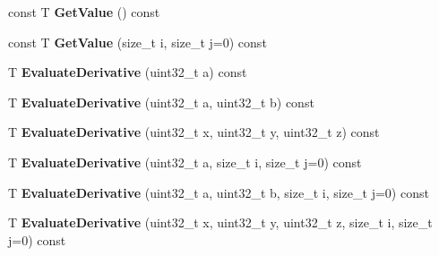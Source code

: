 \begin{DoxyCompactItemize}
\item 
\hypertarget{structatl_1_1_fast_variable_matrix_ac1fac676e85f15f4a449daf2743b4ada}{const T {\bfseries Get\+Value} () const }\label{structatl_1_1_fast_variable_matrix_ac1fac676e85f15f4a449daf2743b4ada}

\item 
\hypertarget{structatl_1_1_fast_variable_matrix_afa69688b8746f6df926e7157bba7d1ee}{const T {\bfseries Get\+Value} (size\+\_\+t i, size\+\_\+t j=0) const }\label{structatl_1_1_fast_variable_matrix_afa69688b8746f6df926e7157bba7d1ee}

\item 
\hypertarget{structatl_1_1_fast_variable_matrix_ab4a1d0ed1ab6ca7bbf3e5fd46d99a037}{T {\bfseries Evaluate\+Derivative} (uint32\+\_\+t a) const }\label{structatl_1_1_fast_variable_matrix_ab4a1d0ed1ab6ca7bbf3e5fd46d99a037}

\item 
\hypertarget{structatl_1_1_fast_variable_matrix_a1d9897ad78586dadfa88cecef82b7d65}{T {\bfseries Evaluate\+Derivative} (uint32\+\_\+t a, uint32\+\_\+t b) const }\label{structatl_1_1_fast_variable_matrix_a1d9897ad78586dadfa88cecef82b7d65}

\item 
\hypertarget{structatl_1_1_fast_variable_matrix_a9ed8f0a5e022e4c6422ac477b79ec08e}{T {\bfseries Evaluate\+Derivative} (uint32\+\_\+t x, uint32\+\_\+t y, uint32\+\_\+t z) const }\label{structatl_1_1_fast_variable_matrix_a9ed8f0a5e022e4c6422ac477b79ec08e}

\item 
\hypertarget{structatl_1_1_fast_variable_matrix_a33afd05d2c83c1fb044c7e71c1d0523b}{T {\bfseries Evaluate\+Derivative} (uint32\+\_\+t a, size\+\_\+t i, size\+\_\+t j=0) const }\label{structatl_1_1_fast_variable_matrix_a33afd05d2c83c1fb044c7e71c1d0523b}

\item 
\hypertarget{structatl_1_1_fast_variable_matrix_ade8e35b01619a9f56871d8cf1a9adfec}{T {\bfseries Evaluate\+Derivative} (uint32\+\_\+t a, uint32\+\_\+t b, size\+\_\+t i, size\+\_\+t j=0) const }\label{structatl_1_1_fast_variable_matrix_ade8e35b01619a9f56871d8cf1a9adfec}

\item 
\hypertarget{structatl_1_1_fast_variable_matrix_a9d5a887bfe8d8c73b6ad7c4d70c2a4c7}{T {\bfseries Evaluate\+Derivative} (uint32\+\_\+t x, uint32\+\_\+t y, uint32\+\_\+t z, size\+\_\+t i, size\+\_\+t j=0) const }\label{structatl_1_1_fast_variable_matrix_a9d5a887bfe8d8c73b6ad7c4d70c2a4c7}


\end{DoxyCompactItemize}
